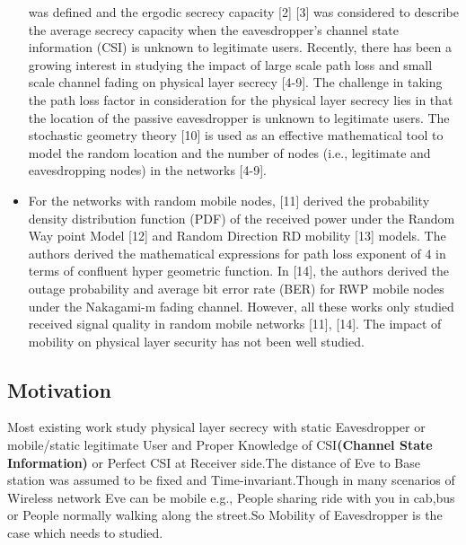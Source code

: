 \documentclass{article}
\begin{document}
\begin{itemize}
was defined and the ergodic secrecy capacity [2] [3] was
considered to describe the average secrecy capacity when the
eavesdropper’s channel state information (CSI) is unknown to
legitimate users. Recently, there has been a growing interest
in studying the impact of large scale path loss and small
scale channel fading on physical layer secrecy [4-9]. The
challenge in taking the path loss factor in consideration for
the physical layer secrecy lies in that the location of the passive
eavesdropper is unknown to legitimate users. The stochastic
geometry theory [10] is used as an effective mathematical tool
to model the random location and the number of nodes (i.e.,
legitimate and eavesdropping nodes) in the networks [4-9].
\item 
For the networks with random mobile nodes, [11] derived
the probability density distribution function (PDF) of the
received power under the Random Way point Model [12] and Random Direction RD mobility [13]
models. The authors derived the mathematical expressions for
path loss exponent of 4 in terms of confluent hyper geometric
function. In [14], the authors derived the outage probability
and average bit error rate (BER) for RWP mobile nodes
under the Nakagami-m fading channel. However, all these
works only studied received signal quality in random mobile
networks [11], [14]. The impact of mobility on physical layer
security has not been well studied.
\end{itemize}

\subsection{Motivation}
    
    Most existing work study physical layer secrecy with static Eavesdropper or mobile/static legitimate User and Proper Knowledge of CSI\textbf{(Channel State Information)} or Perfect CSI at Receiver side.The distance of Eve to Base station was assumed to be fixed and Time-invariant.Though in many scenarios of Wireless network Eve can be mobile e.g., People sharing ride with you in cab,bus or People normally walking along the street.So Mobility of Eavesdropper is the case which needs to studied.
\end{document}
